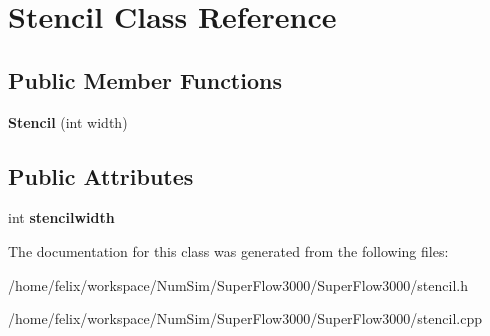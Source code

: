 \hypertarget{class_stencil}{\section{Stencil Class Reference}
\label{class_stencil}
}
\subsection*{Public Member Functions}
\begin{DoxyCompactItemize}
\item 
\hypertarget{class_stencil_aadd208e0a001287ba443f90d6ca01b89}{{\bfseries Stencil} (int width)}\label{class_stencil_aadd208e0a001287ba443f90d6ca01b89}

\end{DoxyCompactItemize}
\subsection*{Public Attributes}
\begin{DoxyCompactItemize}
\item 
\hypertarget{class_stencil_a8543574d7ac8d3571ba703aad105c1b8}{int {\bfseries stencilwidth}}\label{class_stencil_a8543574d7ac8d3571ba703aad105c1b8}

\end{DoxyCompactItemize}


The documentation for this class was generated from the following files\-:\begin{DoxyCompactItemize}
\item 
/home/felix/workspace/\-Num\-Sim/\-Super\-Flow3000/\-Super\-Flow3000/stencil.\-h\item 
/home/felix/workspace/\-Num\-Sim/\-Super\-Flow3000/\-Super\-Flow3000/stencil.\-cpp\end{DoxyCompactItemize}
